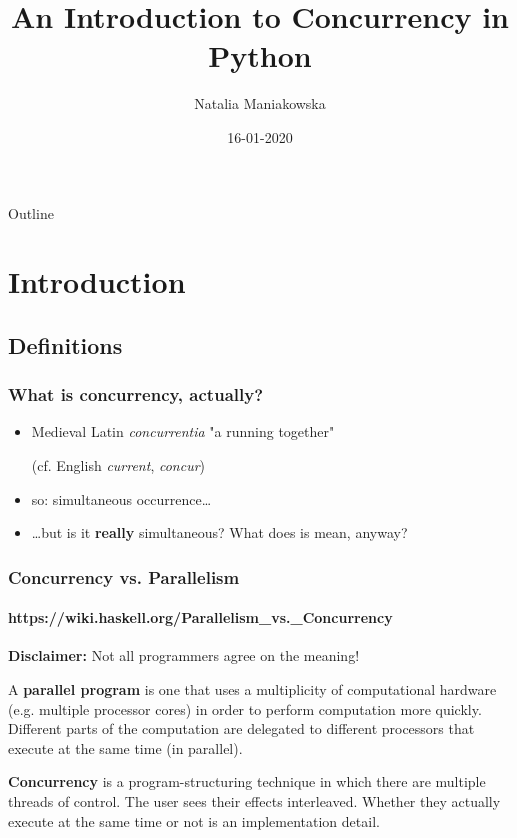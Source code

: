 \documentclass{beamer}
\title{An Introduction to Concurrency in Python}
\author{Natalia Maniakowska}
\institute{skygate}
\date{16-01-2020}
\begin{document}
    \frame{\titlepage}

    \begin{frame}{Outline}
        \tableofcontents
    \end{frame}


    \section{Introduction}

    \subsection{Definitions}


    \begin{frame}
        \frametitle{What is concurrency, actually?}

        \begin{itemize}
            \item Medieval Latin \emph{concurrentia} "a running together"

            (cf. English \emph{current}, \emph{concur})
            \item so: simultaneous occurrence\dots
            \item \dots but is it \textbf{really} simultaneous? What does is mean, anyway?

        \end{itemize}

    \end{frame}

    \begin{frame}
        \frametitle{Concurrency vs. Parallelism}
        \framesubtitle{https://wiki.haskell.org/Parallelism\_vs.\_Concurrency}

        \textbf{Disclaimer:} Not all programmers agree on the meaning!


        \begin{definition} A \textbf{parallel program} is one that uses a multiplicity of
        computational hardware (e.g. multiple processor cores) in order to perform
        computation more quickly. Different parts of the computation are delegated
        to different processors that execute at the same time (in parallel).

        \end{definition}

        \begin{definition} \textbf{Concurrency} is a program-structuring technique
        in which there are multiple threads of control. The user sees their effects interleaved.
        Whether they actually execute at the same time or not is an implementation detail.

        \end{definition}

    \end{frame}
\end{document}
